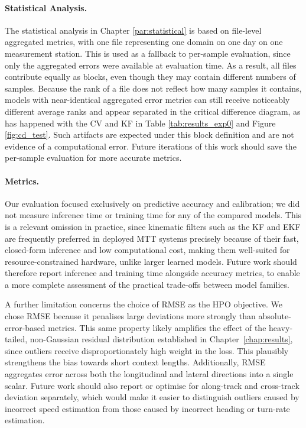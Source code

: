 \paragraph{Statistical Analysis.}
The statistical analysis in Chapter \ref{par:statistical} is based on file-level aggregated metrics, with one file representing one domain on one day on one measurement station. This is used as a fallback to per-sample evaluation, since only the aggregated errors were available at evaluation time. As a result, all files contribute equally as blocks, even though they may contain different numbers of samples. %
Because the rank of a file does not reflect how many samples it contains, models with near-identical aggregated error metrics can still receive noticeably different average ranks and appear separated in the critical difference diagram, as has happened with the \ac{CV} and \ac{KF} in Table \ref{tab:results_exp0} and Figure \ref{fig:cd_test}. Such artifacts are expected under this block definition and are not evidence of a computational error.
Future iterations of this work should save the per-sample evaluation for more accurate metrics.

\paragraph{Metrics.} 
Our evaluation focused exclusively on predictive accuracy and calibration; we did not measure inference time or training time for any of the compared models. This is a relevant omission in practice, since kinematic filters such as the \ac{KF} and \ac{EKF} are frequently preferred in deployed \ac{MTT} systems precisely because of their fast, closed-form inference and low computational cost, making them well-suited for resource-constrained hardware, unlike larger learned models. Future work should therefore report inference and training time alongside accuracy metrics, to enable a more complete assessment of the practical trade-offs between model families.

A further limitation concerns the choice of \ac{RMSE} as the \ac{HPO} objective. We chose \ac{RMSE} because it penalises large deviations more strongly than absolute-error-based metrics. This same property likely amplifies the effect of the heavy-tailed, non-Gaussian residual distribution established in Chapter~\ref{chap:results}, since outliers receive disproportionately high weight in the loss. This plausibly strengthens the bias towards short context lengths. Additionally, \ac{RMSE} aggregates error across both the longitudinal and lateral directions into a single scalar. Future work should also report or optimise for along-track and cross-track deviation separately, which would make it easier to distinguish outliers caused by incorrect speed estimation from those caused by incorrect heading or turn-rate estimation.

